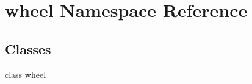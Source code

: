 \hypertarget{namespacewheel}{}\section{wheel Namespace Reference}
\label{namespacewheel}
\subsection*{Classes}
\begin{DoxyCompactItemize}
\item 
class \hyperlink{classwheel_1_1wheel}{wheel}
\end{DoxyCompactItemize}
